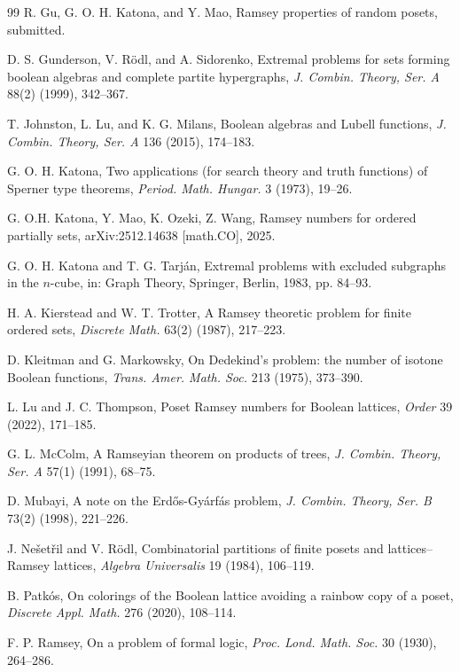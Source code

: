 \documentclass[twoside,12pt]{article}
\begin{document}
\begin{thebibliography}{99}
R. Gu, G. O. H. Katona, and Y. Mao, Ramsey properties of random posets, submitted.

D. S. Gunderson, V. R\"{o}dl, and A. Sidorenko, Extremal problems for sets forming boolean algebras and complete partite hypergraphs, \emph{J. Combin. Theory, Ser. A} 88(2) (1999), 342--367.

T. Johnston, L. Lu, and K. G. Milans, Boolean algebras and Lubell functions, \emph{J. Combin. Theory, Ser. A} 136 (2015), 174--183.

G. O. H. Katona, Two applications (for search theory and truth functions) of Sperner type theorems, \emph{Period. Math. Hungar.} 3 (1973), 19--26.

G. O.H. Katona, Y. Mao, K. Ozeki, Z. Wang, Ramsey numbers for ordered partially sets, arXiv:2512.14638 [math.CO], 2025.

G. O. H. Katona and T. G. Tarj\'{a}n, Extremal problems with excluded subgraphs in the $n$-cube, in: Graph Theory, Springer, Berlin, 1983, pp. 84--93.

H. A. Kierstead and W. T. Trotter, A Ramsey theoretic problem for finite ordered sets, \emph{Discrete Math.} 63(2) (1987), 217--223.



D. Kleitman and G. Markowsky, On Dedekind's problem: the number of isotone Boolean functions, \emph{Trans. Amer. Math. Soc.} 213 (1975), 373--390.

L. Lu and J. C. Thompson, Poset Ramsey numbers for Boolean lattices, \emph{Order} 39 (2022), 171--185.

G. L. McColm, A Ramseyian theorem on products of trees, \emph{J. Combin. Theory, Ser. A} 57(1) (1991), 68--75.

D. Mubayi, A note on the Erd\H{o}s-Gy\'{a}rf\'{a}s problem, \emph{J. Combin. Theory, Ser. B} 73(2) (1998), 221--226.

J. Ne\v{s}et\v{r}il and V. R\"{o}dl, Combinatorial partitions of finite posets and lattices--Ramsey lattices, \emph{Algebra Universalis} 19 (1984), 106--119.

B. Patk\'{o}s, On colorings of the Boolean lattice avoiding a rainbow copy of a poset, \emph{Discrete Appl. Math.} 276 (2020), 108--114.

F. P. Ramsey, On a problem of formal logic, \emph{Proc. Lond. Math. Soc.} 30 (1930), 264--286.


\end{thebibliography}
\end{document}
